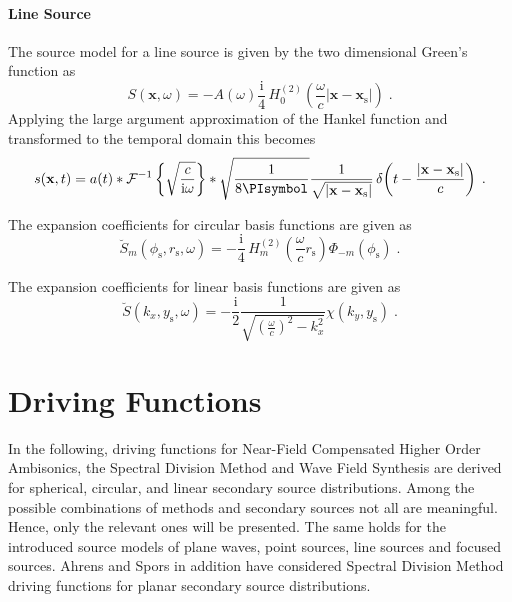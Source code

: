 \documentclass[a4paper]{book}
\newcommand{\reproduce}[1]{%
    \href{#1}{\color{link}\large\Pointinghand}%
}%
\newcommand{\ft}{\footnotesize}                                   %
\newcommand{\PI}{\PIsymbol}%
\newcommand{\I}{\mathrm{i}}                          %
\renewcommand{\vec}[1]{\mathbf{#1}}                  %
\newcommand{\x}{\vec{x}}                             %
\newcommand{\xs}{\x_\text{s}}                        %
\newcommand{\omegac}{\frac{\omega}{c}}               %
\renewcommand{\H}[2]{\,H_{#1}^{(#2)}\!}              %
\newcommand{\deltafunc}[1]{\,\delta\!\left(#1\right)}%
\newcommand{\IFT}[1]{%
    \mathcal{F}^{-1}\left\{#1\right\}}%
\newcommand{\qp}{\;.}                                             %
\newcommand\eqlabel[2][]{%
  \label{eq:#2}%
}
\begin{document}
{%
\paragraph{Line Source}
\label{sec:line_source}
%
The source model for a line source is given by the two dimensional Green's
function as\cite[][(8.47)]{Williams1999}
%
\begin{equation}
    S(\x,\omega) = -A(\omega) \frac{\I}{4} \H{0}{2} \left(\omegac |\x-\xs|\right)
    \qp
    \eqlabel{S:ls}
\end{equation}
%
%    
%
Applying the large argument approximation of the Hankel
function\cite[][(4.23)]{Williams1999} and transformed to
the temporal domain this becomes
%
\begin{equation}
    s(\x,t) = a(t) * \IFT{\sqrt{\frac{c}{\I\omega}}} * \sqrt{\frac{1}{8\PI}} \frac{1}{\sqrt{|\x-\xs|}}
    \deltafunc{t - \frac{|\x-\xs|}{c}}
    \qp
    \eqlabel{s:ls}
\end{equation}
%

The expansion coefficients for circular basis functions are given as
%
\begin{equation}
    \breve{S}_m(\phi_\text{s},r_\text{s},\omega) = -\frac{\I}{4}
    \H{m}{2} \left(\omegac r_\text{s}\right)
    \Phi_{-m}(\phi_\text{s}) \qp
    \label{eq:line_source_circular}
\end{equation}
%

The expansion coefficients for linear basis functions are given as
%
\begin{equation}
    \breve{S}(k_x,y_\text{s},\omega) = -\frac{\I}{2} \frac{1}{\sqrt{(\omegac)^2-k_x^2}}
    \chi(k_y,y_\text{s})\qp
    \label{eq:line_source_linear}
\end{equation}
%

\section{Driving Functions}
\label{sec:driving_functions}

In the following, driving functions for Near-Field Compensated High\-er Order
Ambisonics, the Spectral Division Method and Wave Field Synthesis are derived
for spherical, circular, and linear secondary source distributions. Among the
possible combinations of methods and secondary sources not all are
meaningful. Hence, only the relevant ones will be presented. The same holds for the
introduced source models of plane waves, point sources, line sources and focused
sources.
Ahrens and
Spors\cite{Ahrens2010a}
in addition have considered Spectral Division Method driving functions for
planar secondary source distributions.

}
\end{document}
